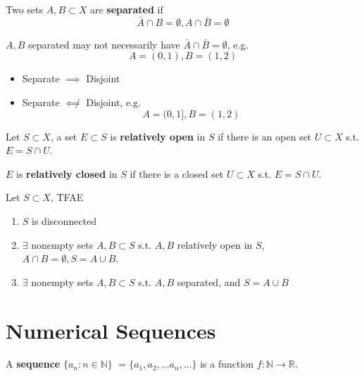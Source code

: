 \begin{definition}[Separatedness]
    Two sets $A,B \subset X$ are \textbf{separated} if 
    \[
        \bar{A}  \cap B = \emptyset, A \cap \bar{B}  = \emptyset
    \]
\end{definition}

\begin{remark}
    $A, B$ separated may not necessarily have $\bar{A} \cap \bar{B}  = \emptyset$,
    e.g. 
    \[
        A = (0, 1), B = (1, 2)
    \]
\end{remark}
\begin{remark}
    \begin{itemize}
        \item Separate $\implies$ Disjoint 
        \item Separate $\not \impliedby$ Disjoint, e.g. 
        \[
        A = (0, 1], B = (1, 2)
        \]
    \end{itemize} 
\end{remark}

\begin{definition}
    Let $S \subset X$, a set $E \subset S$ is 
    \textbf{relatively open} in $S$ if there is an open set $U \subset X$
    s.t. $E = S \cap U$. 
    \medskip 

    $E$ is \textbf{relatively closed} in $S$ 
    if there is a closed set $U \subset X$
    s.t. $E = S \cap U$.
\end{definition}

\begin{theorem}
    Let $S \subset X$, TFAE 
    \begin{enumerate}
        \item $S$ is disconnected 
        \item $\exists$ nonempty sets $A, B \subset S$ s.t. $A, B$ relatively 
        open in $S$, $A \cap B = \emptyset, S = A \cup B$.
        \item $\exists $ nonempty sets $A, B \subset S$ s.t. $A, B$ separated, and 
        $S = A \cup B$
    \end{enumerate} 
\end{theorem}


\newpage

\section{Numerical Sequences}

\begin{definition}[Sequence]
    A \textbf{sequence} $\{ a_n: n \in \mathbb{N} \}$
    $= \{ a_1, a_2, \hdots a_n, \hdots \} $ is a function 
    $f: \mathbb{N} \to \mathbb{R}$.
\end{definition}

